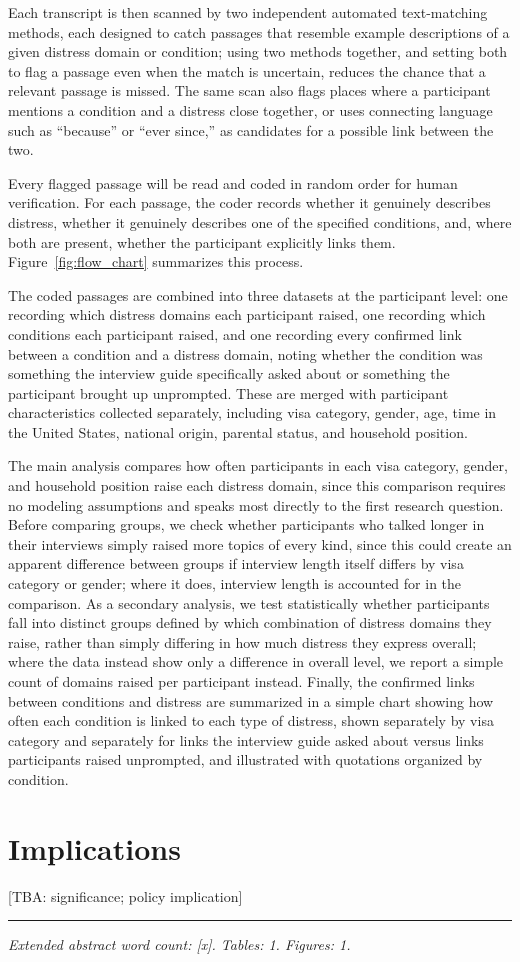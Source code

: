 \documentclass[12pt]{article}
\begin{document}
Each transcript is then scanned by two independent automated text-matching methods, each designed to catch passages that
resemble example descriptions of a given distress domain or condition; using two methods together, and setting both to
flag a passage even when the match is uncertain, reduces the chance that a relevant passage is missed. The same scan also
flags places where a participant mentions a condition and a distress close together, or uses connecting language such as
``because'' or ``ever since,'' as candidates for a possible link between the two.

Every flagged passage will be read and coded in random order for human verification. For each passage, the coder records 
whether it genuinely describes distress, whether it genuinely describes one of the specified conditions, and, where 
both are present, whether the participant explicitly links them. Figure~\ref{fig:flow_chart} summarizes this process.



The coded passages are combined into three datasets at the participant level: one recording which distress domains each
participant raised, one recording which conditions each participant raised, and one recording every confirmed link
between a condition and a distress domain, noting whether the condition was something the interview guide specifically
asked about or something the participant brought up unprompted. These are merged with participant characteristics
collected separately, including visa category, gender, age, time in the United States, national origin, parental
status, and household position.

The main analysis compares how often participants in each visa category, gender, and household position raise each
distress domain, since this comparison requires no modeling assumptions and speaks most directly to the first research
question. Before comparing groups, we check whether participants who talked longer in their interviews simply raised
more topics of every kind, since this could create an apparent difference between groups if interview length itself
differs by visa category or gender; where it does, interview length is accounted for in the comparison. As a secondary
analysis, we test statistically whether participants fall into distinct groups defined by which combination of distress
domains they raise, rather than simply differing in how much distress they express overall; where the data instead show
only a difference in overall level, we report a simple count of domains raised per participant instead. Finally, the
confirmed links between conditions and distress are summarized in a simple chart showing how often each condition is
linked to each type of distress, shown separately by visa category and separately for links the interview guide asked
about versus links participants raised unprompted, and illustrated with quotations organized by condition.

\section{Implications}
[TBA: significance; policy implication]

\vspace{2em}
\noindent\rule{\linewidth}{0.4pt}

\vspace{0.5em}
\noindent\emph{Extended abstract word count: [x]. Tables: 1. Figures: 1.}

\printbibliography
\end{document}
